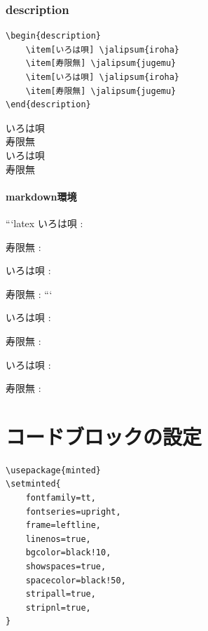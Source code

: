 \documentclass[article, head_space=25truemm, foot_space=15truemm, gutter=15truemm]{jlreq}
\begin{document}
\subsubsection{description}

\begin{verbatim}
\begin{description}
    \item[いろは唄] \jalipsum{iroha}
    \item[寿限無] \jalipsum{jugemu}
    \item[いろは唄] \jalipsum{iroha}
    \item[寿限無] \jalipsum{jugemu}
\end{description}
\end{verbatim}

\begin{description}
    \item[いろは唄] 
    \item[寿限無] 
    \item[いろは唄] 
    \item[寿限無] 
\end{description}

\paragraph{markdown環境}

\begin{markdown}
```latex
いろは唄
: 

寿限無
: 

いろは唄
: 

寿限無
: 
```
\end{markdown}

\begin{markdown}
いろは唄
: 

寿限無
: 

いろは唄
: 

寿限無
: 
\end{markdown}

\section{コードブロックの設定}

\begin{verbatim}
\usepackage{minted}
\setminted{
    fontfamily=tt,
    fontseries=upright,
    frame=leftline,
    linenos=true,
    bgcolor=black!10,
    showspaces=true,
    spacecolor=black!50,
    stripall=true,
    stripnl=true,
}
\end{verbatim}
\end{document}
